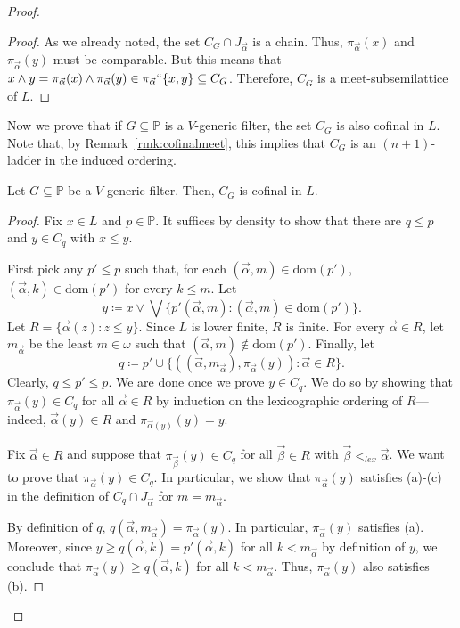 \documentclass[10pt,a4paper]{amsart}
\begin{document}
\begin{proof}
\begin{proof}
As we already noted, the set $C_G \cap J_{\vec{\alpha}}$ is a chain. Thus, $\pi_{\vec{\alpha}}(x)$ and $\pi_{\vec{\alpha}}(y)$ must be comparable. But this means that $x \wedge y = \pi_{\vec{\alpha}}(x) \wedge \pi_{\vec{\alpha}}(y) \in \pi_{\vec{\alpha}}``\{x,y\} \subseteq C_G$. Therefore, $C_G$ is a meet-subsemilattice of $L$.
\end{proof}
  
Now we prove that if $G\subseteq \mathbb{P}$ is a $V$-generic filter, the set $C_G$ is also cofinal in $L$. Note that, by Remark~\ref{rmk:cofinalmeet}, this implies that $C_G$ is an $(n+1)$-ladder in the induced ordering.
\begin{claim}
Let $G\subseteq \mathbb{P}$ be a $V$-generic filter. Then, $C_G$ is cofinal in $L$.
\end{claim}
\begin{proof}
Fix $x \in L$ and $p \in \mathbb{P}$. It suffices by density to show that there are $q \le p$ and $y \in C_q$ with $x \le y$.  

First pick any $p' \le p$ such that, for each $(\vec{\alpha}, m) \in \mathrm{dom}(p')$, $(\vec{\alpha}, k) \in \mathrm{dom}(p')$ for every $k \le m$. 
Let
\[
y \coloneqq x \vee \bigvee \big\{p' (\vec{\alpha}, m) : (\vec{\alpha}, m) \in \mathrm{dom}(p')\big\}.
\]
Let $R = \{\vec{\alpha}(z) : z \le y\}$. Since $L$ is lower finite, $R$ is finite. For every $\vec{\alpha} \in R$, let $m_{\vec{\alpha}}$ be the least $m \in\omega$ such that $(\vec{\alpha}, m) \not\in \mathrm{dom}(p')$. Finally, let 
\[
q \coloneqq p' \cup \big\{((\vec{\alpha}, m_{\vec{\alpha}}), \pi_{\vec{\alpha}}(y)) : \vec{\alpha} \in R\big\}.
\]
Clearly, $q \le p' \le p$. We are done once we prove $y \in C_q$.  We do so by showing that $\pi_{\vec{\alpha}}(y) \in C_q$ for all $\vec{\alpha} \in R$ by induction on the lexicographic ordering of $R$---indeed, $\vec{\alpha}(y) \in R$ and $\pi_{\vec{\alpha}(y)}(y) = y$. %

 Fix $\vec{\alpha} \in R$ and suppose that $\pi_{\vec{\beta}} (y) \in C_q$ for all $\vec{\beta} \in R$ with $\vec{\beta} <_{lex} \vec{\alpha}$. We want to prove that $\pi_{\vec{\alpha}} (y) \in C_q$. In particular, we show that $\pi_{\vec{\alpha}} (y)$ satisfies (a)-(c) in the definition of $C_q \cap J_{\vec{\alpha}}$ for $m = m_{\vec{\alpha}}$.
 
 By definition of $q$, $q(\vec{\alpha}, m_{\vec{\alpha}}) = \pi_{\vec{\alpha}}(y)$. In particular, $\pi_{\vec{\alpha}}(y)$ satisfies (a). Moreover, since  $y \ge q(\vec{\alpha}, k) = p'(\vec{\alpha}, k) $ for all $k  < m_{\vec{\alpha}}$ by definition of $y$, we conclude that $\pi_{\vec{\alpha}}(y) \ge q(\vec{\alpha}, k)$ for all $k  < m_{\vec{\alpha}}$. Thus, $\pi_{\vec{\alpha}}(y)$ also satisfies (b). 
 

\end{proof}
\end{proof}
\end{document}
